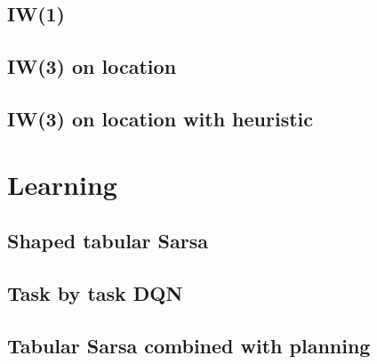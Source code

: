 \subsection{\acl{IW}(1)}
\subsection{\acl{IW}(3) on location}
\subsection{\acl{IW}(3) on location with heuristic}
\section{Learning}
\subsection{Shaped tabular Sarsa}
\subsection{Task by task \acs{DQN}}
\subsection{Tabular Sarsa combined with planning}


